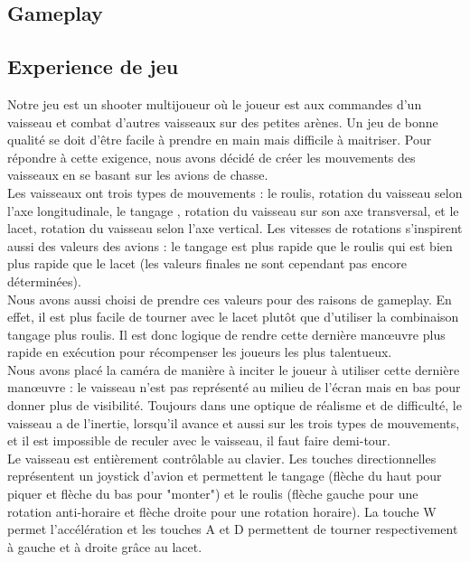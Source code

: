 \documentclass[12pt, titlepage]{article}
\begin{document}
\begin{spacing}{1.5}
\newpage
\section{Gameplay}

\subsection{Experience de jeu}

Notre jeu est un shooter multijoueur où le joueur est aux commandes d'un vaisseau et combat d'autres vaisseaux sur des petites arènes. Un jeu de bonne qualité se doit d'être facile à prendre en main mais difficile à maitriser. Pour répondre à cette exigence, nous avons décidé de créer les mouvements des vaisseaux en se basant sur les avions de chasse.\\

Les vaisseaux ont trois types de mouvements : le roulis, rotation du vaisseau selon l'axe longitudinale, le tangage , rotation du vaisseau sur son axe transversal, et le lacet, rotation du vaisseau selon l'axe vertical. Les vitesses de rotations s'inspirent aussi des valeurs des avions : le tangage est plus rapide que le roulis qui est bien plus rapide que le lacet (les valeurs finales ne sont cependant pas encore déterminées). \\

Nous avons aussi choisi de prendre ces valeurs pour des raisons de gameplay. En effet, il est plus facile de tourner avec le lacet plutôt que d'utiliser la combinaison tangage plus roulis. Il est donc logique de rendre cette dernière manœuvre plus rapide en exécution pour récompenser les joueurs les plus talentueux. \\

Nous avons placé la caméra de manière à inciter le joueur à utiliser cette dernière manœuvre : le vaisseau n'est pas représenté au milieu de l'écran mais en bas pour donner plus de visibilité. Toujours dans une optique de réalisme et de difficulté, le vaisseau a de l'inertie, lorsqu'il avance et aussi sur les trois types de mouvements, et il est impossible de reculer avec le vaisseau, il
faut faire demi-tour. \\

Le vaisseau est entièrement contrôlable au clavier. Les touches directionnelles représentent un joystick d'avion et permettent le tangage (flèche du haut pour piquer et flèche du bas pour "monter") et le roulis (flèche gauche pour une rotation anti-horaire et flèche droite pour une rotation horaire). La touche W permet l'accélération et les touches A et D permettent de tourner respectivement à gauche et à droite grâce au lacet.\\


\end{spacing}
\end{document}
